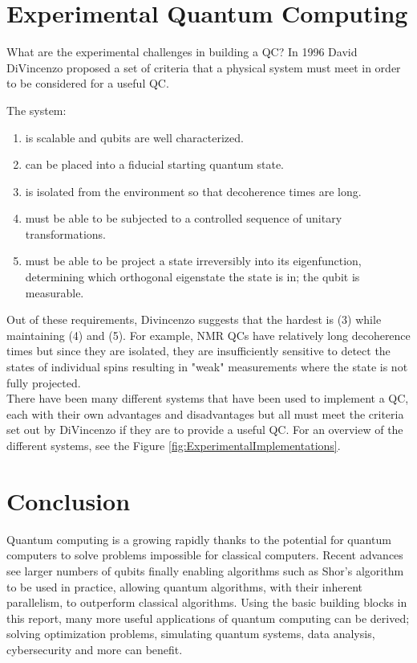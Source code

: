 \documentclass[reqno]{amsart}
\numberwithin{equation}{section}
\numberwithin{figure}{section}
\begin{document}
\section{Experimental Quantum Computing}
\begin{justify}
What are the experimental challenges in building a QC? In 1996 David DiVincenzo proposed a set of criteria that a physical system must meet in order to be considered for a useful QC. \cite{DiVincenzo1996}

The system:
    \begin{enumerate}
        \item is scalable and qubits are well characterized.
        \item can be placed into a fiducial starting quantum state.
        \item is isolated from the environment so that decoherence times are long.
        \item must be able to be subjected to a controlled sequence of unitary transformations.
        \item must be able to be project a state irreversibly into its eigenfunction, determining which orthogonal eigenstate the state is in; the qubit is measurable.
    \end{enumerate}

    Out of these requirements, Divincenzo suggests that the hardest is (3) while maintaining (4) and (5). For example, NMR QCs have relatively long decoherence times \cite{Bloembergen1948} but since they are isolated, they are insufficiently sensitive to detect the states of individual spins resulting in "weak" measurements where the state is not fully projected. \cite{CoryFahmyHavel1997} \\

There have been many different systems that have been used to implement a QC, each with their own advantages and disadvantages but all must meet the criteria set out by DiVincenzo if they are to provide a useful QC. For an overview of the different systems, see the Figure \ref{fig:ExperimentalImplementations}.
\end{justify}
\section{Conclusion}
\begin{justify}
    Quantum computing is a growing rapidly thanks to the potential for quantum computers to solve problems impossible for classical computers. Recent advances see larger numbers of qubits finally enabling algorithms such as Shor's algorithm to be used in practice, allowing quantum algorithms, with their inherent parallelism, to outperform classical algorithms. Using the basic building blocks in this report, many more useful applications of quantum computing can be derived; solving optimization problems, simulating quantum systems, data analysis, cybersecurity and more can benefit. \\
\end{justify}
\newpage
\appendix
\end{document}
